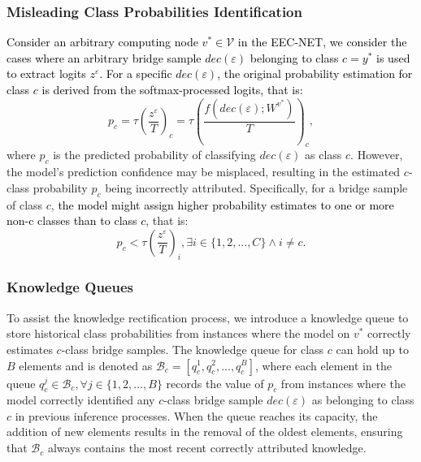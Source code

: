 \documentclass[10pt,journal]{IEEEtran}
\begin{document}
\subsubsection{Misleading Class Probabilities Identification}
\textcolor{black}{Consider an arbitrary computing node $v^* \in \mathcal{V}$ in the EEC-NET, we consider the cases where an arbitrary bridge sample $dec(\varepsilon)$ belonging to class $c=y^*$ is used to extract logits $z^\varepsilon$. For a specific $dec(\varepsilon)$, the original probability estimation for class $c$ is derived from the softmax-processed logits, that is:}
\begin{equation}
    p_c=\tau (\frac{z^\varepsilon}{T})_c=\tau (\frac{{f(dec(\varepsilon );{W^{{v^*}}})}}{T})_c,
\end{equation}
where $p_c$ is the predicted probability of classifying $dec(\varepsilon)$ as class $c$. 
However, the model’s prediction confidence may be misplaced, resulting in the estimated $c$-class probability $p_c$ being incorrectly attributed. Specifically, for a bridge sample of class $c$, \textcolor{black}{the model might assign higher probability estimates to one or more non-c classes than to class $c$}, that is:
\begin{equation}
    {p_c} < \tau (\frac{z^\varepsilon}{T})_i,\exists i \in \{ 1,2,...,C\} \wedge i \neq c .
\end{equation}
\color{black}{This condition highlights scenarios where the class predictions are incorrectly attributed, which can introduce biased updates that propagate through the EEC-NET hierarchy, ultimately degrading the performance of the cloud-based model.}


\subsubsection{Knowledge Queues}
To assist the knowledge rectification process, we introduce a knowledge queue to store historical class probabilities from instances where the model on $v^*$ correctly estimates $c$-class bridge samples. The knowledge queue for class $c$ can hold up to $B$ elements and is denoted as $\mathcal{B}_c =[{q_c^1, q_c^2, ..., q_c^B}]$, where each element in the queue $q_c^j \in \mathcal{B}_c, \forall j \in \{1, 2, ..., B\}$ records the value of $p_c$ from instances where the model correctly identified any $c$-class bridge sample $dec(\varepsilon)$ as belonging to class $c$ in previous inference processes. When the queue reaches its capacity, the addition of new elements results in the removal of the oldest elements, ensuring that $\mathcal{B}_c$ always contains the most recent correctly attributed knowledge.
\end{document}
